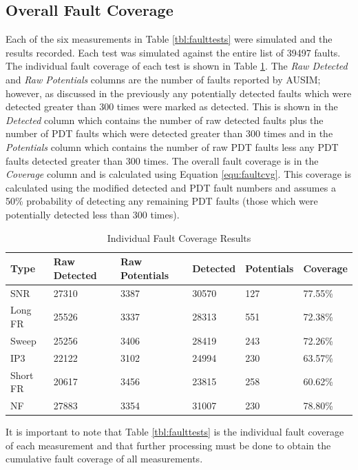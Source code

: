 \documentclass[12pt]{report}
\begin{document}
\subsection{Overall Fault Coverage}
Each of the six measurements in Table \ref{tbl:faulttests} were simulated and the results recorded.  Each test was simulated against the entire list of 39497 faults.  The individual fault coverage of each test is shown in Table \ref{tbl:faultresults}.  The \textit{Raw Detected} and \textit{Raw Potentials} columns are the number of faults reported by AUSIM; however, as discussed in the previously any potentially detected faults which were detected greater than 300 times were marked as detected.  This is shown in the \textit{Detected} column which contains the number of raw detected faults plus the number of PDT faults which were detected greater than 300 times and in the \textit{Potentials} column which contains the number of raw PDT faults less any PDT faults detected greater than 300 times.  The overall fault coverage is in the \textit{Coverage} column and is calculated using Equation \ref{equ:faultcvg}.  This coverage is calculated using the modified detected and PDT fault numbers and assumes a 50\% probability of detecting any remaining PDT faults (those which were potentially detected less than 300 times).
\begin{table}
  \begin{center}
    \caption{Individual Fault Coverage Results}
    \label{tbl:faultresults}
    \begin{tabular}{|l|l|l|l|l|l|}
      \hline
      Type & Raw Detected & Raw Potentials & Detected & Potentials & Coverage \\ \hline
      SNR & 27310 & 3387 & 30570 & 127 & 77.55\% \\ \hline
      Long FR & 25526 & 3337 & 28313 & 551 & 72.38\% \\ \hline
      Sweep & 25256 & 3406 & 28419 & 243 & 72.26\% \\ \hline 
      IP3 & 22122 & 3102 & 24994 & 230 & 63.57\% \\ \hline
      Short FR & 20617 & 3456 & 23815 & 258 & 60.62\% \\ \hline 
      NF & 27883 & 3354 & 31007 & 230 & 78.80\% \\ 
      \hline
    \end{tabular}
  \end{center}
\end{table}
It is important to note that Table \ref{tbl:faulttests} is the individual fault coverage of each measurement and that further processing must be done to obtain the cumulative fault coverage of all measurements.  
\end{document}
